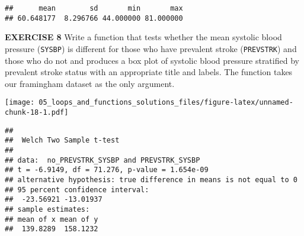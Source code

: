 \documentclass[
]{article}
\newenvironment{Shaded}{\begin{snugshade}}{\end{snugshade}}
\newcommand{\CommentTok}[1]{\textcolor[rgb]{0.56,0.35,0.01}{\textit{#1}}}
\newcommand{\ControlFlowTok}[1]{\textcolor[rgb]{0.13,0.29,0.53}{\textbf{#1}}}
\newcommand{\DataTypeTok}[1]{\textcolor[rgb]{0.13,0.29,0.53}{#1}}
\newcommand{\KeywordTok}[1]{\textcolor[rgb]{0.13,0.29,0.53}{\textbf{#1}}}
\newcommand{\NormalTok}[1]{#1}
\newcommand{\OperatorTok}[1]{\textcolor[rgb]{0.81,0.36,0.00}{\textbf{#1}}}
\newcommand{\StringTok}[1]{\textcolor[rgb]{0.31,0.60,0.02}{#1}}
\begin{document}
\begin{verbatim}
##      mean        sd       min       max 
## 60.648177  8.296766 44.000000 81.000000
\end{verbatim}

\textbf{EXERCISE 8} Write a function that tests whether the mean
systolic blood pressure (\texttt{SYSBP}) is different for those who have
prevalent stroke (\texttt{PREVSTRK}) and those who do not and produces a
box plot of systolic blood pressure stratified by prevalent stroke
status with an appropriate title and labels. The function takes our
framingham dataset as the only argument.

\begin{Shaded}
\end{Shaded}

\texttt{[image: 05\_loops\_and\_functions\_solutions\_files/figure-latex/unnamed-chunk-18-1.pdf]}

\begin{verbatim}
## 
##  Welch Two Sample t-test
## 
## data:  no_PREVSTRK_SYSBP and PREVSTRK_SYSBP
## t = -6.9149, df = 71.276, p-value = 1.654e-09
## alternative hypothesis: true difference in means is not equal to 0
## 95 percent confidence interval:
##  -23.56921 -13.01937
## sample estimates:
## mean of x mean of y 
##  139.8289  158.1232
\end{verbatim}
\end{document}
